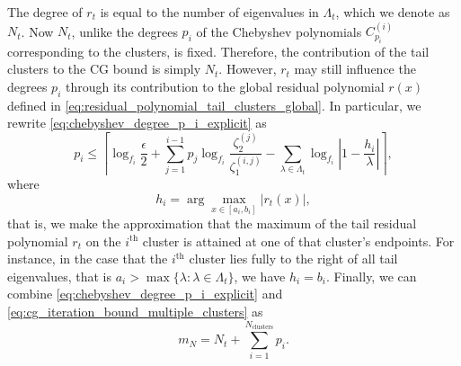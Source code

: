 The degree of $r_{t}$ is equal to the number of eigenvalues in $\Lambda_{t}$, which we denote as $N_{t}$. Now $N_{t}$, unlike the degrees $p_i$ of the Chebyshev polynomials $C^{(i)}_{p_i}$ corresponding to the clusters, is fixed. Therefore, the contribution of the tail clusters to the CG bound is simply $N_{t}$. However, $r_{t}$ may still influence the degrees $p_i$ through its contribution to the global residual polynomial $r(x)$ defined in \cref{eq:residual_polynomial_tail_clusters_global}. In particular, we rewrite \cref{eq:chebyshev_degree_p_i_explicit} as
\begin{equation}
    p_i \leq \left\lceil\log_{f_i}{\frac{\epsilon}{2}} + \sum_{j=1}^{i-1} p_j\log_{f_i}{\frac{\zeta^{(j)}_2}{\zeta^{(i,j)}_1}} - \sum_{\lambda\in\Lambda_{t}}
    \log_{f_i}\left|1-\frac{h_i}{\lambda}\right|\right\rceil,
\end{equation}
where
\[
    h_i = \arg\max_{x\in[a_i,b_i]} \left|r_{t}(x)\right|,
\]
that is, we make the approximation that the maximum of the tail residual polynomial $r_{t}$ on the $i^{\text{th}}$ cluster is attained at one of that cluster's endpoints. For instance, in the case that the $i^{\text{th}}$ cluster lies fully to the right of all tail eigenvalues, that is $a_i > \max\{\lambda : \lambda \in \Lambda_{t}\}$, we have $h_i = b_i$. Finally, we can combine \cref{eq:chebyshev_degree_p_i_explicit}
and \cref{eq:cg_iteration_bound_multiple_clusters} as
\begin{equation}
    m_N = N_{t} + \sum_{i=1}^{N_{\text{clusters}}} p_i.
    \label{eq:cg_iteration_bound_multiple_clusters_s}
\end{equation}

